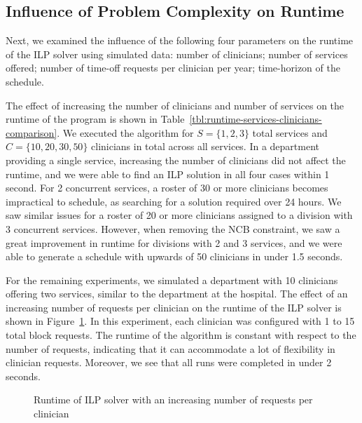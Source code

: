 

\subsection{Influence of Problem Complexity on Runtime}
Next, we examined the influence of the following four parameters on the
runtime of the ILP solver using simulated data:
number of clinicians;
number of services offered;
number of time-off requests per clinician per year;
time-horizon of the schedule.

The effect of increasing the number of clinicians and number of services 
on the runtime of the program is shown in Table~\ref{tbl:runtime-services-clinicians-comparison}.
We executed the algorithm for
$S = \{1, 2, 3\}$ total services and $C = \{10, 20, 30, 50\}$ clinicians in  
total across all services. 
In a department providing a single service, increasing the number of clinicians
did not affect the runtime, and we were able to find an ILP solution in all four cases
within 1 second.
For 2 concurrent services, a roster of 30 or more
clinicians becomes impractical to schedule, as searching for a solution required
over 24 hours. We saw similar issues for a roster of 20 or more clinicians
assigned to a division with 3 concurrent services. However, when removing the
NCB constraint, we saw a great improvement in runtime for divisions with 2 and 3
services, and we were able to generate a schedule with upwards of 50 clinicians
in under 1.5 seconds.



For the remaining experiments, we simulated a department with 10 clinicians offering 
two services, similar to the department at the hospital. 
The effect of an increasing number of requests per clinician on the runtime of
the ILP solver is shown in Figure~\ref{fig:runtime-requests}.
In this experiment, each clinician was configured with 1 to 15 total block requests.
The runtime of the algorithm is constant with respect to the number of requests,
indicating that it can accommodate a lot of flexibility in
clinician requests. Moreover, we see that all runs were completed in under
2 seconds.

\begin{figure}[h]
	\centering
	\def\svgwidth{\columnwidth}
	\caption{Runtime of ILP solver with an increasing number of requests per clinician}
	
  \label{fig:runtime-requests}
\end{figure}

